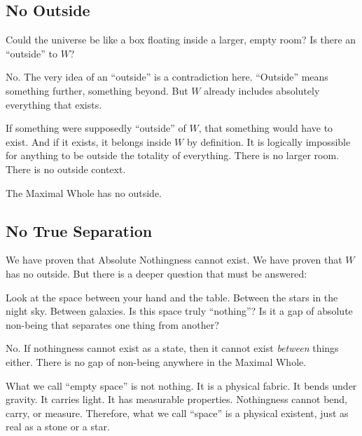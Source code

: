 \documentclass[11pt]{article}
\theoremstyle{canonstyle}
\begin{document}
\subsection{No Outside}

\begin{reflect}
Could the universe be like a box floating inside a larger, empty room? Is there an ``outside'' to $W$?
\end{reflect}

No. The very idea of an ``outside'' is a contradiction here. ``Outside'' means something further, something beyond. But $W$ already includes absolutely everything that exists. 

If something were supposedly ``outside'' of $W$, that something would have to exist. And if it exists, it belongs inside $W$ by definition. It is logically impossible for anything to be outside the totality of everything. There is no larger room. There is no outside context.

\begin{keyresult}
The Maximal Whole has no outside.
\end{keyresult}

\subsection{No True Separation}

We have proven that Absolute Nothingness cannot exist. We have proven that $W$ has no outside. But there is a deeper question that must be answered:

\begin{reflect}
Look at the space between your hand and the table. Between the stars in the night sky. Between galaxies. Is this space truly ``nothing''? Is it a gap of absolute non-being that separates one thing from another?
\end{reflect}

No. If nothingness cannot exist as a state, then it cannot exist \emph{between} things either. There is no gap of non-being anywhere in the Maximal Whole.

What we call ``empty space'' is not nothing. It is a physical fabric. It bends under gravity. It carries light. It has measurable properties. Nothingness cannot bend, carry, or measure. Therefore, what we call ``space'' is a physical existent, just as real as a stone or a star.
\end{document}
